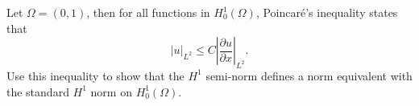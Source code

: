 \begin{exercise}
    Let $\Omega = (0, 1)$, then for all functions in $H^1_0(\Omega)$, Poincaré's inequality states that
    \begin{equation*}
        \lvert u \rvert_{L^2} \leq C \left\lvert \frac{\partial u}{\partial x} \right\rvert_{L^2}.
    \end{equation*}
    Use this inequality to show that the $H^1$ semi-norm defines a norm equivalent with the standard $H^1$ norm on $H^1_0(\Omega)$.
\end{exercise}